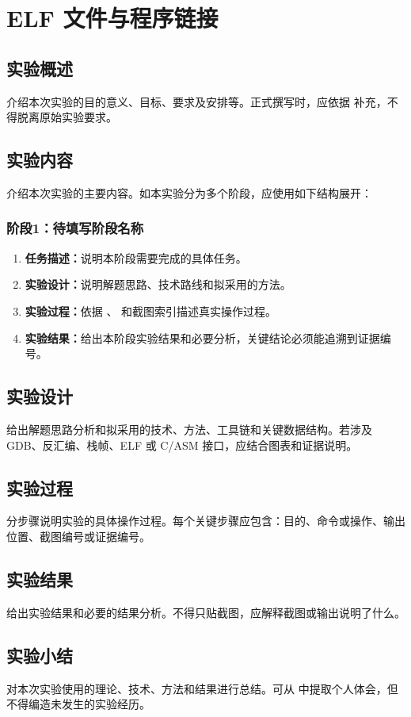 \section{ELF 文件与程序链接}

\subsection{实验概述}

介绍本次实验的目的意义、目标、要求及安排等。正式撰写时，应依据  补充，不得脱离原始实验要求。

\subsection{实验内容}

介绍本次实验的主要内容。如本实验分为多个阶段，应使用如下结构展开：

\subsubsection{阶段1：待填写阶段名称}

\begin{enumerate}[label=\arabic*.]
    \item \textbf{任务描述：}说明本阶段需要完成的具体任务。
    \item \textbf{实验设计：}说明解题思路、技术路线和拟采用的方法。
    \item \textbf{实验过程：}依据 、 和截图索引描述真实操作过程。
    \item \textbf{实验结果：}给出本阶段实验结果和必要分析，关键结论必须能追溯到证据编号。
\end{enumerate}

\subsection{实验设计}

给出解题思路分析和拟采用的技术、方法、工具链和关键数据结构。若涉及 GDB、反汇编、栈帧、ELF 或 C/ASM 接口，应结合图表和证据说明。

\subsection{实验过程}

分步骤说明实验的具体操作过程。每个关键步骤应包含：目的、命令或操作、输出位置、截图编号或证据编号。

\subsection{实验结果}

给出实验结果和必要的结果分析。不得只贴截图，应解释截图或输出说明了什么。

\subsection{实验小结}

对本次实验使用的理论、技术、方法和结果进行总结。可从  中提取个人体会，但不得编造未发生的实验经历。
